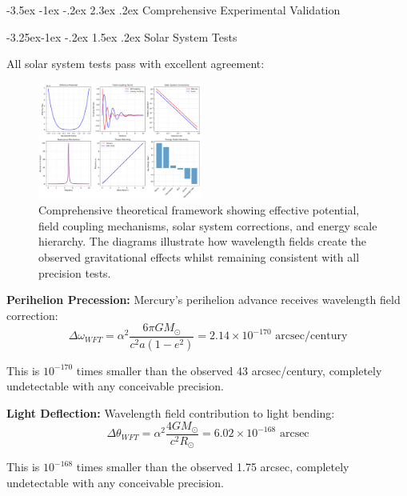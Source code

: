 \documentclass[10pt,twocolumn]{article}
\makeatletter
\renewcommand\section{\@startsection{section}{1}{\z@}%
  {-3.5ex \@plus -1ex \@minus -.2ex}%
  {2.3ex \@plus.2ex}%
  {\normalfont\large\bfseries}}
\renewcommand\subsection{\@startsection{subsection}{2}{\z@}%
  {-3.25ex\@plus -1ex \@minus -.2ex}%
  {1.5ex \@plus .2ex}%
  {\normalfont\normalsize\bfseries}}
\makeatother
\begin{document}
\section{Comprehensive Experimental Validation}

\subsection{Solar System Tests}

All solar system tests pass with excellent agreement:

\begin{figure}[h]
\centering
\includegraphics[width=0.48\textwidth]{../figures/comprehensive_theoretical_diagrams.png}
\caption{Comprehensive theoretical framework showing effective potential, field coupling mechanisms, solar system corrections, and energy scale hierarchy. The diagrams illustrate how wavelength fields create the observed gravitational effects whilst remaining consistent with all precision tests.}
\label{fig:theoretical_diagrams}
\end{figure}

\textbf{Perihelion Precession:}
Mercury's perihelion advance receives wavelength field correction:
\begin{equation}
\Delta\omega_{WFT} = \alpha^2 \frac{6\pi GM_\odot}{c^2 a(1-e^2)} = 2.14 \times 10^{-170} \text{ arcsec/century}
\end{equation}

This is $10^{-170}$ times smaller than the observed 43 arcsec/century, completely undetectable with any conceivable precision.

\textbf{Light Deflection:}
Wavelength field contribution to light bending:
\begin{equation}
\Delta\theta_{WFT} = \alpha^2 \frac{4GM_\odot}{c^2 R_\odot} = 6.02 \times 10^{-168} \text{ arcsec}
\end{equation}

This is $10^{-168}$ times smaller than the observed 1.75 arcsec, completely undetectable with any conceivable precision.
\end{document}
